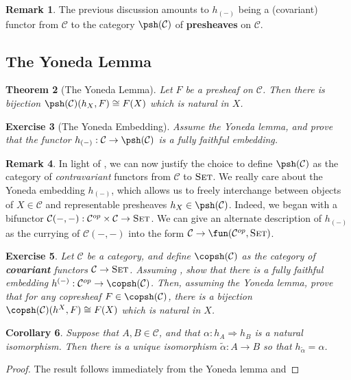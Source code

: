 \documentclass[11pt]{article}
\theoremstyle{plain}
\newtheorem{thm}{Theorem}[subsection]
\newtheorem{exrc}[thm]{Exercise}
\newtheorem{cor}[thm]{Corollary}
\theoremstyle{definition}
\newtheorem{remk}[thm]{Remark}
\newcommand{\s}[1]{\mathcal{#1}}
\newcommand{\Set}{{\textsc{Set}}}
\begin{document}
\begin{remk}
    The previous discussion amounts to $h_{(-)}$ being a (covariant) functor from $\s C$ to the category $\psh(\s C)$ of \textbf{presheaves} on $\s C$.
\end{remk}

\subsection{The Yoneda Lemma}

\begin{thm}[The Yoneda Lemma]
    Let $F$ be a presheaf on $\s C$. Then there is bijection $\psh(\s C)(h_X, F) \cong F(X)$ which is natural in $X$.
\end{thm}

\begin{exrc}[The Yoneda Embedding]
    Assume the Yoneda lemma, and prove that the functor $h_{(-)} : \s C \to \psh(\s C)$ is a fully faithful embedding.
\end{exrc}

\begin{remk}
    In light of , we can now justify the choice to define $\psh(\s C)$ as the category of \textit{contravariant} functors from $\s C$ to $\Set$. We really care about the Yoneda embedding $h_{(-)}$, which allows us to freely interchange between objects of $X \in \s C$ and representable presheaves $h_X \in \psh(\s C)$. Indeed, we began with a bifunctor $\s C(-,-) : \s C^{op} \times \s C \to \Set$. We can give an alternate description of $h_{(-)}$ as the currying of $\s C(-,-)$ into the form $\s C \to \fun(\s C^{op}, \Set)$.
\end{remk}

\begin{exrc}
    Let $\s C$ be a category, and define $\copsh(\s C)$ as the category of \textbf{covariant} functors $\s C \to \Set$. Assuming , show that there is a fully faithful embedding $h^{(-)} : \s C^{op} \to \copsh(\s C)$. Then, assuming the Yoneda lemma, prove that for any copresheaf $F \in \copsh(\s C)$, there is a bijection $\copsh(\s C)(h^X, F) \cong F(X)$ which is natural in $X$.
\end{exrc}

\begin{cor}
    Suppose that $A,B \in \s C$, and that $\alpha : h_A \Rightarrow h_B$ is a natural isomorphism. Then there is a unique isomorphism $\widetilde{\alpha} : A \to B$ so that $h_{\widetilde{\alpha}} = \alpha$.
\end{cor}
\begin{proof}
    The result follows immediately from the Yoneda lemma and 
\end{proof}
\end{document}
